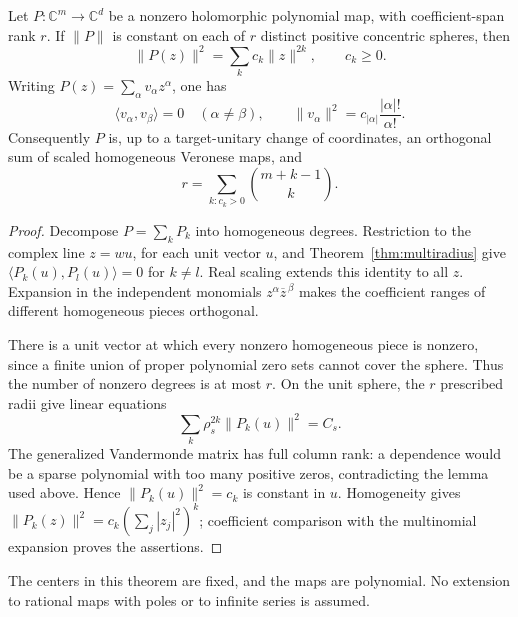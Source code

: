 \begin{theorem}\label{thm:multisphere}
Let $P:\mathbb C^m\to\mathbb C^d$ be a nonzero holomorphic polynomial map,
with coefficient-span rank $r$. If $\|P\|$ is constant on each of $r$
distinct positive concentric spheres, then
\[
 \|P(z)\|^2=\sum_kc_k\|z\|^{2k},\qquad c_k\ge0.
\]
Writing $P(z)=\sum_\alpha v_\alpha z^\alpha$, one has
\[
 \langle v_\alpha,v_\beta\rangle=0\quad(\alpha\ne\beta),
 \qquad
 \|v_\alpha\|^2=c_{|\alpha|}\frac{|\alpha|!}{\alpha!}.
\]
Consequently $P$ is, up to a target-unitary change of coordinates, an
orthogonal sum of scaled homogeneous Veronese maps, and
\[
 r=\sum_{k:c_k>0}\binom{m+k-1}{k}.
\]
\end{theorem}
\begin{proof}
Decompose $P=\sum_kP_k$ into homogeneous degrees. Restriction to the complex
line $z=wu$, for each unit vector $u$, and
Theorem~\ref{thm:multiradius} give
$\langle P_k(u),P_l(u)\rangle=0$ for $k\ne l$.
Real scaling extends this identity to all $z$. Expansion in the independent
monomials $z^\alpha\overline z^{\,\beta}$ makes the coefficient ranges of
different homogeneous pieces orthogonal.

There is a unit vector at which every nonzero homogeneous piece is nonzero,
since a finite union of proper polynomial zero sets cannot cover the sphere.
Thus the number of nonzero degrees is at most $r$. On the unit sphere, the
$r$ prescribed radii give linear equations
\[
 \sum_k\rho_s^{2k}\|P_k(u)\|^2=C_s.
\]
The generalized Vandermonde matrix has full column rank: a dependence would
be a sparse polynomial with too many positive zeros, contradicting the lemma
used above. Hence $\|P_k(u)\|^2=c_k$ is constant in $u$. Homogeneity gives
$\|P_k(z)\|^2=c_k(\sum_j|z_j|^2)^k$; coefficient comparison with the
multinomial expansion proves the assertions.
\end{proof}
The centers in this theorem are fixed, and the maps are polynomial.
No extension to rational maps with poles or to infinite series is assumed.

